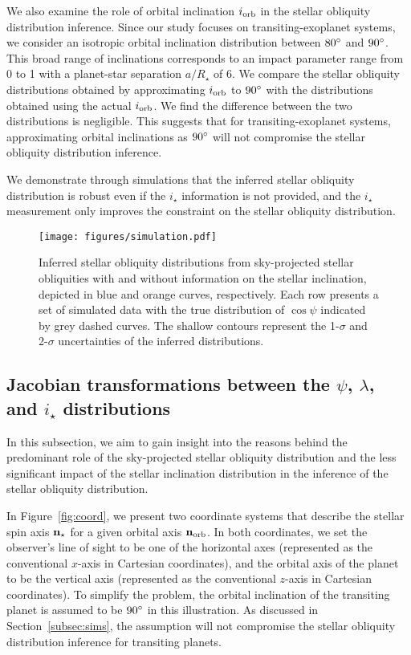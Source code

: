 \documentclass[twocolumn,times]{aastex631}
\begin{document}
We also examine the role of orbital inclination $i_{\rm orb}$ in the stellar obliquity distribution inference. Since our study focuses on transiting-exoplanet systems, we consider an isotropic orbital inclination distribution between $80\mbox{$^\circ$}$ and $90\mbox{$^\circ$}$. This broad range of inclinations corresponds to an impact parameter range from 0 to 1 with a planet-star separation $a/R_\star$ of 6.
We compare the stellar obliquity distributions obtained by approximating $i_{\rm orb}$ to $90\mbox{$^\circ$}$ with the distributions obtained using the actual $i_{\rm orb}$. We find the difference between the two distributions is negligible. This suggests that for transiting-exoplanet systems, approximating orbital inclinations as $90\mbox{$^\circ$}$ will not compromise the stellar obliquity distribution inference.

We demonstrate through simulations that the inferred stellar obliquity distribution is robust even if the $i_\star$ information is not provided, and the $i_\star$ measurement only improves the constraint on the stellar obliquity distribution.

\begin{figure}[ht!]
    \centering
    \texttt{[image: figures/simulation.pdf]}
    \caption{Inferred stellar obliquity distributions from sky-projected stellar obliquities with and without information on the stellar inclination, depicted in blue and orange curves, respectively. Each row presents a set of simulated data with the true distribution of $\cos{\psi}$ indicated by grey dashed curves. The shallow contours represent the 1-$\sigma$ and 2-$\sigma$ uncertainties of the inferred distributions.}
    \label{fig:simulation}
\end{figure}

\subsection{Jacobian transformations between the $\psi$, $\lambda$, and \lowercase{$i_\star$} distributions}\label{sec:jacobian}

In this subsection, we aim to gain insight into the reasons behind the predominant role of the sky-projected stellar obliquity distribution and the less significant impact of the stellar inclination distribution in the inference of the stellar obliquity distribution.

In Figure~\ref{fig:coord}, we present two coordinate systems that describe the stellar spin axis $\bf{n}_{\star}$ for a given orbital axis $\bf{n}_{\rm orb}$. In both coordinates, we set the observer's line of sight to be one of the horizontal axes (represented as the conventional $x$-axis in Cartesian coordinates), and the orbital axis of the planet to be the vertical axis (represented as the conventional $z$-axis in Cartesian coordinates). To simplify the problem, the orbital inclination of the transiting planet is assumed to be $90\mbox{$^\circ$}$ in this illustration. As discussed in Section~\ref{subsec:sims}, the assumption will not compromise the stellar obliquity distribution inference for transiting planets.
\end{document}
